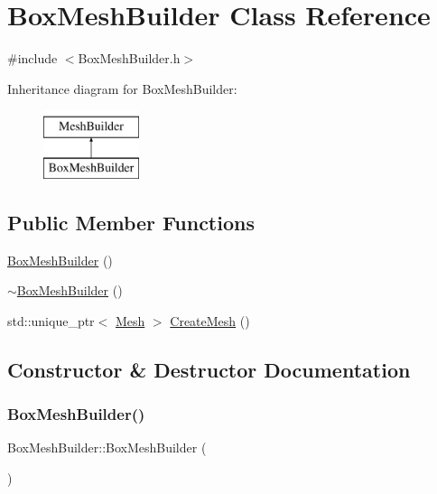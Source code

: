 \hypertarget{class_box_mesh_builder}{}\section{Box\+Mesh\+Builder Class Reference}
\label{class_box_mesh_builder}


{\ttfamily \#include $<$Box\+Mesh\+Builder.\+h$>$}

Inheritance diagram for Box\+Mesh\+Builder\+:\begin{figure}[H]
\begin{center}
\leavevmode
\includegraphics[height=2.000000cm]{class_box_mesh_builder}
\end{center}
\end{figure}
\subsection*{Public Member Functions}
\begin{DoxyCompactItemize}
\item 
\mbox{\hyperlink{class_box_mesh_builder_a54ba344b20292fce25e3008d9f441020}{Box\+Mesh\+Builder}} ()
\item 
\mbox{\hyperlink{class_box_mesh_builder_a15ba61afdc9e03c8b8db90df1f231041}{$\sim$\+Box\+Mesh\+Builder}} ()
\item 
std\+::unique\+\_\+ptr$<$ \mbox{\hyperlink{class_mesh}{Mesh}} $>$ \mbox{\hyperlink{class_box_mesh_builder_a3c5a331f00e2bec89baff4711e0d2dc4}{Create\+Mesh}} ()
\end{DoxyCompactItemize}


\subsection{Constructor \& Destructor Documentation}
\mbox{\label{class_box_mesh_builder_a54ba344b20292fce25e3008d9f441020}} 
\subsubsection{\texorpdfstring{BoxMeshBuilder()}{BoxMeshBuilder()}}
{\footnotesize\ttfamily Box\+Mesh\+Builder\+::\+Box\+Mesh\+Builder (\begin{DoxyParamCaption}{ }\end{DoxyParamCaption})}

